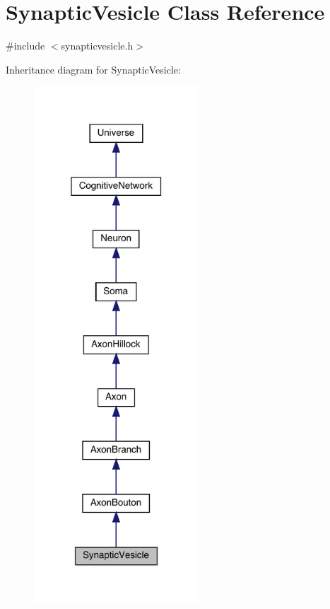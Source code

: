\hypertarget{class_synaptic_vesicle}{}\section{Synaptic\+Vesicle Class Reference}
\label{class_synaptic_vesicle}


{\ttfamily \#include $<$synapticvesicle.\+h$>$}



Inheritance diagram for Synaptic\+Vesicle\+:\nopagebreak
\begin{figure}[H]
\begin{center}
\leavevmode
\includegraphics[width=175pt]{class_synaptic_vesicle__inherit__graph}
\end{center}
\end{figure}


